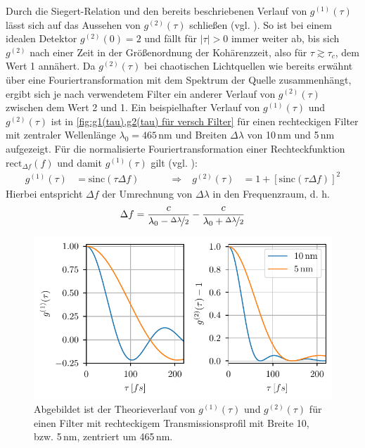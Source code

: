 Durch die Siegert-Relation und den bereits beschriebenen Verlauf von $g^{(1)}(\tau)$ lässt sich auf das Aussehen von $g^{(2)}(\tau)$ schließen (vgl. \cite[Kap. 6.3]{foxQuantumOpticsIntroduction2006}). 
So ist bei einem idealen Detektor $g^{(2)}(0)=2$ und fällt für $|\tau|>0$ immer weiter ab, bis sich $g^{(2)}$ nach einer Zeit in der Größenordnung der Kohärenzzeit, also für $\tau\gtrsim\tau_c$, dem Wert 1 annähert. 
Da $g^{(2)}(\tau)$ bei chaotischen Lichtquellen wie bereits erwähnt über eine Fouriertransformation mit dem Spektrum der Quelle zusammenhängt, ergibt sich je nach verwendetem Filter ein anderer Verlauf von $g^{(2)}(\tau)$ zwischen dem Wert 2 und 1. 
Ein beispielhafter Verlauf von $g^{(1)}(\tau)$ und $g^{(2)}(\tau)$ ist in \autoref{fig:g1(tau),g2(tau) für versch Filter} für einen rechteckigen Filter mit zentraler Wellenlänge $\lambda_0 = 465\,\mathrm{nm}$ und Breiten $\Delta\lambda$ von 10\,nm und 5\,nm aufgezeigt. 
Für die normalisierte Fouriertransformation einer Rechteckfunktion $\mathrm{rect}_{\Delta f}\left(f\right)$ und damit $g^{(1)}(\tau)$ gilt (vgl. \cite[Kap. 3.2]{wangIntroductionOrthogonalTransforms2012}):
\begin{align}
    g^{(1)}(\tau) &= \mathrm{sinc}\left(\tau\Delta f\right) \quad\quad\quad \Rightarrow& g^{(2)}(\tau) &= 1+ \left[\mathrm{sinc}\left(\tau\Delta f\right)\right]^2
\end{align}
Hierbei entspricht $\Delta f$ der Umrechnung von $\Delta\lambda$ in den Frequenzraum, d. h. 
\begin{equation}
    \Delta f = \frac{c}{\lambda_0 - \nicefrac{\Delta\lambda}{2}} - \frac{c}{\lambda_0 + \nicefrac{\Delta\lambda}{2}}
\end{equation}
\begin{figure}[h]
    \centering
    \includegraphics{images/Theorie/g1_g2_tau.pdf}
    \caption{Abgebildet ist der Theorieverlauf von $g^{(1)}(\tau)$ und $g^{(2)}(\tau)$ für einen Filter mit rechteckigem Transmissionsprofil mit Breite 10, bzw. 5\,nm, zentriert um 465\,nm.}
    \label{fig:g1(tau),g2(tau) für versch Filter}
\end{figure}
